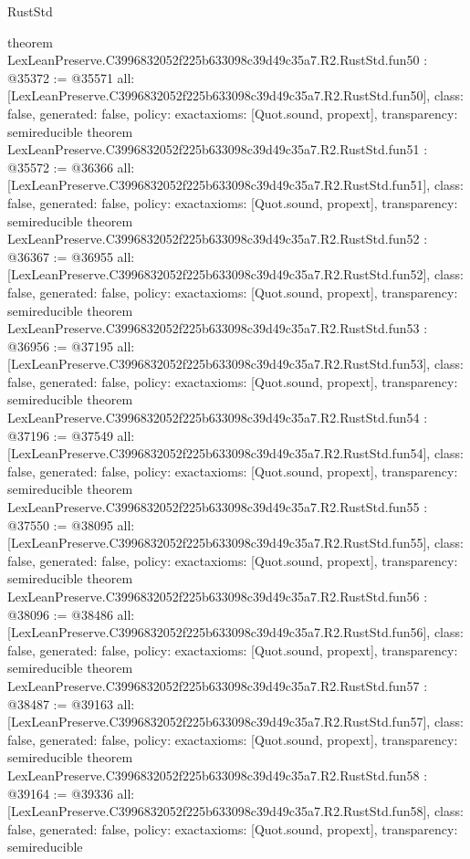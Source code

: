 \begin{lexlean}{RustStd}
\begin{coremodule}
{}
theorem LexLeanPreserve.C3996832052f225b633098c39d49c35a7.R2.RustStd.fun50 : @35372 := @35571 {
  all: [LexLeanPreserve.C3996832052f225b633098c39d49c35a7.R2.RustStd.fun50],
  class: false,
  generated: false,
  policy: exact{axioms: [Quot.sound, propext]},
  transparency: semireducible
}
theorem LexLeanPreserve.C3996832052f225b633098c39d49c35a7.R2.RustStd.fun51 : @35572 := @36366 {
  all: [LexLeanPreserve.C3996832052f225b633098c39d49c35a7.R2.RustStd.fun51],
  class: false,
  generated: false,
  policy: exact{axioms: [Quot.sound, propext]},
  transparency: semireducible
}
theorem LexLeanPreserve.C3996832052f225b633098c39d49c35a7.R2.RustStd.fun52 : @36367 := @36955 {
  all: [LexLeanPreserve.C3996832052f225b633098c39d49c35a7.R2.RustStd.fun52],
  class: false,
  generated: false,
  policy: exact{axioms: [Quot.sound, propext]},
  transparency: semireducible
}
theorem LexLeanPreserve.C3996832052f225b633098c39d49c35a7.R2.RustStd.fun53 : @36956 := @37195 {
  all: [LexLeanPreserve.C3996832052f225b633098c39d49c35a7.R2.RustStd.fun53],
  class: false,
  generated: false,
  policy: exact{axioms: [Quot.sound, propext]},
  transparency: semireducible
}
theorem LexLeanPreserve.C3996832052f225b633098c39d49c35a7.R2.RustStd.fun54 : @37196 := @37549 {
  all: [LexLeanPreserve.C3996832052f225b633098c39d49c35a7.R2.RustStd.fun54],
  class: false,
  generated: false,
  policy: exact{axioms: [Quot.sound, propext]},
  transparency: semireducible
}
theorem LexLeanPreserve.C3996832052f225b633098c39d49c35a7.R2.RustStd.fun55 : @37550 := @38095 {
  all: [LexLeanPreserve.C3996832052f225b633098c39d49c35a7.R2.RustStd.fun55],
  class: false,
  generated: false,
  policy: exact{axioms: [Quot.sound, propext]},
  transparency: semireducible
}
theorem LexLeanPreserve.C3996832052f225b633098c39d49c35a7.R2.RustStd.fun56 : @38096 := @38486 {
  all: [LexLeanPreserve.C3996832052f225b633098c39d49c35a7.R2.RustStd.fun56],
  class: false,
  generated: false,
  policy: exact{axioms: [Quot.sound, propext]},
  transparency: semireducible
}
theorem LexLeanPreserve.C3996832052f225b633098c39d49c35a7.R2.RustStd.fun57 : @38487 := @39163 {
  all: [LexLeanPreserve.C3996832052f225b633098c39d49c35a7.R2.RustStd.fun57],
  class: false,
  generated: false,
  policy: exact{axioms: [Quot.sound, propext]},
  transparency: semireducible
}
theorem LexLeanPreserve.C3996832052f225b633098c39d49c35a7.R2.RustStd.fun58 : @39164 := @39336 {
  all: [LexLeanPreserve.C3996832052f225b633098c39d49c35a7.R2.RustStd.fun58],
  class: false,
  generated: false,
  policy: exact{axioms: [Quot.sound, propext]},
  transparency: semireducible
}
\end{coremodule}
\end{lexlean}
